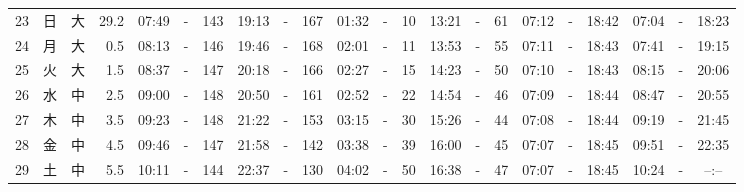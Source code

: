 \documentclass[12pt,a4j]{jsarticle}
\begin{document}
\begin{table}[htbp]
\begin{center}
{\begin{tabular}{|rc|cr|ccrccr|ccrccr|ccc|ccc|}
23 & 日 & 大 & 29.2 &  07:49 &-& 143 &  19:13 &-& 167 &  01:32 &-&  10 &  13:21 &-&  61 & 07:12 & -& 18:42 & 07:04 & -& 18:23 \\
24 & 月 & 大 &  0.5 &  08:13 &-& 146 &  19:46 &-& 168 &  02:01 &-&  11 &  13:53 &-&  55 & 07:11 & -& 18:43 & 07:41 & -& 19:15 \\
25 & 火 & 大 &  1.5 &  08:37 &-& 147 &  20:18 &-& 166 &  02:27 &-&  15 &  14:23 &-&  50 & 07:10 & -& 18:43 & 08:15 & -& 20:06 \\
26 & 水 & 中 &  2.5 &  09:00 &-& 148 &  20:50 &-& 161 &  02:52 &-&  22 &  14:54 &-&  46 & 07:09 & -& 18:44 & 08:47 & -& 20:55 \\
27 & 木 & 中 &  3.5 &  09:23 &-& 148 &  21:22 &-& 153 &  03:15 &-&  30 &  15:26 &-&  44 & 07:08 & -& 18:44 & 09:19 & -& 21:45 \\
28 & 金 & 中 &  4.5 &  09:46 &-& 147 &  21:58 &-& 142 &  03:38 &-&  39 &  16:00 &-&  45 & 07:07 & -& 18:45 & 09:51 & -& 22:35 \\
29 & 土 & 中 &  5.5 &  10:11 &-& 144 &  22:37 &-& 130 &  04:02 &-&  50 &  16:38 &-&  47 & 07:07 & -& 18:45 & 10:24 & -& --:-- \\
   \hline
   \end{tabular}}
   \end{center}
\end{table}
\newpage
\end{document}
